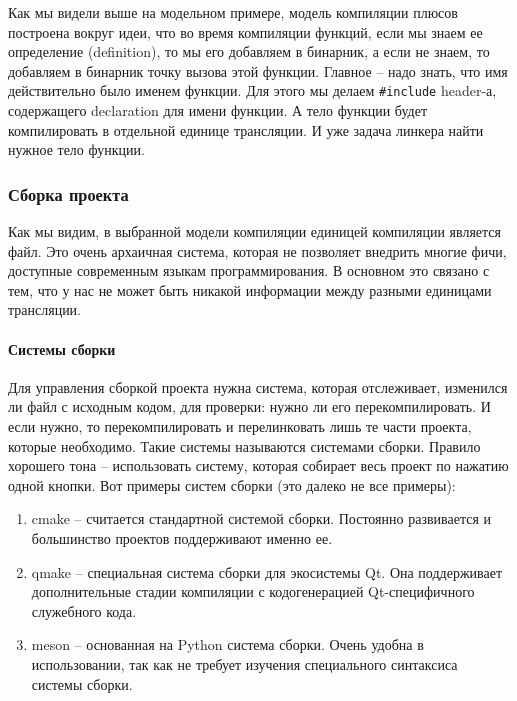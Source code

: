 Как мы видели выше на модельном примере, модель компиляции плюсов построена вокруг идеи, что во время компиляции функций, если мы знаем ее определение (definition), то мы его добавляем в бинарник, а если не знаем, то добавляем в бинарник точку вызова этой функции.
Главное -- надо знать, что имя действительно было именем функции.
Для этого мы делаем \verb"#include" header-а, содержащего declaration для имени функции.
А тело функции будет компилировать в отдельной единице трансляции.
И уже задача линкера найти нужное тело функции.

\subsubsection{Сборка проекта}

Как мы видим, в выбранной модели компиляции единицей компиляции является файл.
Это очень архаичная система, которая не позволяет внедрить многие фичи, доступные современным языкам программирования.
В основном это связано с тем, что у нас не может быть никакой информации между разными единицами трансляции.

\paragraph{Системы сборки}

Для управления сборкой проекта нужна система, которая отслеживает, изменился ли файл с исходным кодом, для проверки: нужно ли его перекомпилировать.
И если нужно, то перекомпилировать и перелинковать лишь те части проекта, которые необходимо.
Такие системы называются системами сборки.
Правило хорошего тона -- использовать систему, которая собирает весь проект по нажатию одной кнопки.
Вот примеры систем сборки (это далеко не все примеры):
\begin{enumerate}
\item cmake -- считается стандартной системой сборки.
Постоянно развивается и большинство проектов поддерживают именно ее.

\item qmake -- специальная система сборки для экосистемы Qt.
Она поддерживает дополнительные стадии компиляции с кодогенерацией Qt-специфичного служебного кода.

\item meson -- основанная на Python система сборки.
Очень удобна в использовании, так как не требует изучения специального синтаксиса системы сборки.
\end{enumerate}

